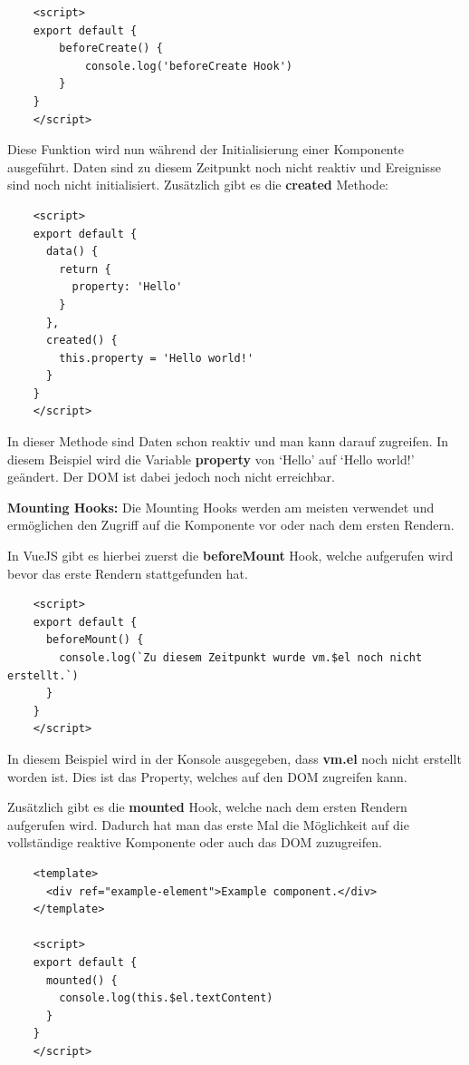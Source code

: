 \begin{lstlisting}
    <script>
    export default {
    	beforeCreate() {
    		console.log('beforeCreate Hook')
    	}
    }
    </script>
\end{lstlisting}

Diese Funktion wird nun während der Initialisierung einer Komponente ausgeführt. Daten sind zu diesem Zeitpunkt noch nicht reaktiv und Ereignisse sind noch nicht initialisiert.
Zusätzlich gibt es die \textbf{created} Methode:

\begin{lstlisting}
    <script>
    export default {
      data() {
        return {
          property: 'Hello'
        }
      },
      created() {
        this.property = 'Hello world!'
      }
    }
    </script>
\end{lstlisting}

In dieser Methode sind Daten schon reaktiv und man kann darauf zugreifen. In diesem Beispiel wird die Variable \textbf{property} von ‘Hello’ auf ‘Hello world!’ geändert. Der DOM ist dabei jedoch noch nicht erreichbar.

\textbf{Mounting Hooks:}
\newline
Die Mounting Hooks werden am meisten verwendet und ermöglichen den Zugriff auf die Komponente vor oder nach dem ersten Rendern.

In VueJS gibt es hierbei zuerst die \textbf{beforeMount} Hook, welche aufgerufen wird bevor das erste Rendern stattgefunden hat.

\begin{lstlisting}
    <script>
    export default {
      beforeMount() {
        console.log(`Zu diesem Zeitpunkt wurde vm.$el noch nicht erstellt.`)
      }
    }
    </script>
\end{lstlisting}

In diesem Beispiel wird in der Konsole ausgegeben, dass \textbf{vm.el} noch nicht erstellt worden ist. Dies ist das Property, welches auf den DOM zugreifen kann. 

Zusätzlich gibt es die \textbf{mounted} Hook, welche nach dem ersten Rendern aufgerufen wird. Dadurch hat man das erste Mal die Möglichkeit auf die vollständige reaktive Komponente oder auch das DOM zuzugreifen.

\begin{lstlisting}
    <template>
      <div ref="example-element">Example component.</div>
    </template>
    
    <script>
    export default {
      mounted() {
        console.log(this.$el.textContent)
      }
    }
    </script>
\end{lstlisting}

